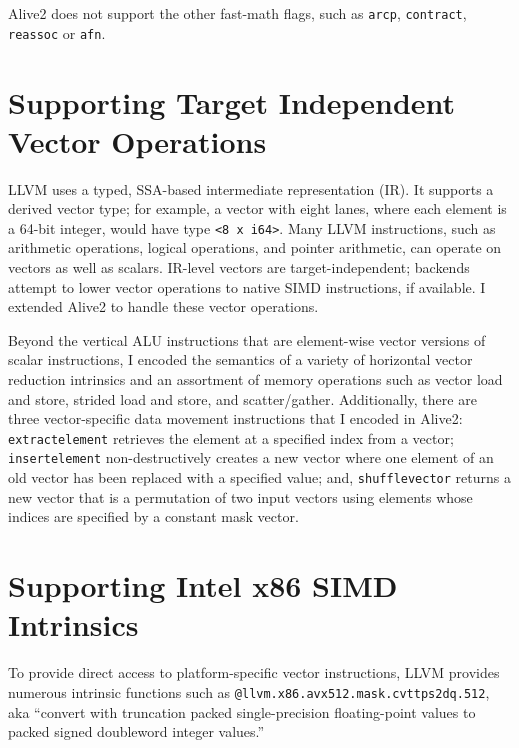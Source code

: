 Alive2 does not support the other fast-math flags, such as \texttt{arcp},
\texttt{contract}, \texttt{reassoc} or \texttt{afn}.

\section{Supporting Target Independent Vector Operations}

LLVM uses a typed, SSA-based intermediate representation (IR).
%
It supports a derived vector type; for example, a vector with
eight lanes, where each element is a 64-bit integer, would have type
\texttt{<8 x i64>}.
%
Many LLVM instructions, such as arithmetic operations, logical operations,
and pointer arithmetic, can operate on vectors as well as scalars.
%
IR-level vectors are target-independent; backends attempt to lower
vector operations to native SIMD instructions, if available.
I extended Alive2 to handle these vector operations.


Beyond the vertical ALU instructions that are element-wise vector
versions of scalar instructions, I encoded the semantics of a
variety of horizontal vector reduction intrinsics and an assortment of
memory operations such as vector load and store, strided load and
store, and scatter/gather.
%
Additionally, there are three vector-specific data movement
instructions that I encoded in Alive2:
%
\texttt{extractelement} retrieves the element at a specified index
from a vector;
%
\texttt{insertelement} non-destructively creates a new vector where
one element of an old vector has been replaced with a specified value;
%
and, \texttt{shufflevector} returns a new vector that is a permutation
of two input vectors using elements whose indices are specified by a
constant mask vector.


\section{Supporting Intel x86 SIMD Intrinsics}

To provide direct access to platform-specific vector
instructions, LLVM provides numerous intrinsic functions such as
\texttt{@llvm.x86.avx512.mask.cvttps2dq.512}, aka ``convert with
truncation packed single-precision floating-point values to packed
signed doubleword integer values.''

